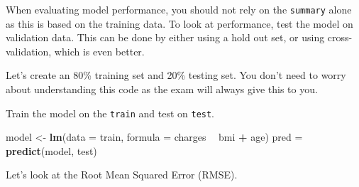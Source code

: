 \documentclass[openany]{book}
\newenvironment{Shaded}{\begin{snugshade}}{\end{snugshade}}
\newcommand{\CommentTok}[1]{\textcolor[rgb]{0.56,0.35,0.01}{\textit{#1}}}
\newcommand{\ControlFlowTok}[1]{\textcolor[rgb]{0.13,0.29,0.53}{\textbf{#1}}}
\newcommand{\DataTypeTok}[1]{\textcolor[rgb]{0.13,0.29,0.53}{#1}}
\newcommand{\DecValTok}[1]{\textcolor[rgb]{0.00,0.00,0.81}{#1}}
\newcommand{\FloatTok}[1]{\textcolor[rgb]{0.00,0.00,0.81}{#1}}
\newcommand{\KeywordTok}[1]{\textcolor[rgb]{0.13,0.29,0.53}{\textbf{#1}}}
\newcommand{\NormalTok}[1]{#1}
\newcommand{\OperatorTok}[1]{\textcolor[rgb]{0.81,0.36,0.00}{\textbf{#1}}}
\newcommand{\StringTok}[1]{\textcolor[rgb]{0.31,0.60,0.02}{#1}}
\begin{document}
When evaluating model performance, you should not rely on the \texttt{summary} alone as this is based on the training data. To look at performance, test the model on validation data. This can be done by either using a hold out set, or using cross-validation, which is even better.

Let's create an 80\% training set and 20\% testing set. You don't need to worry about understanding this code as the exam will always give this to you.

\begin{Shaded}
\end{Shaded}

Train the model on the \texttt{train} and test on \texttt{test}.

\begin{Shaded}
\begin{Highlighting}[]
\NormalTok{model <-}\StringTok{ }\KeywordTok{lm}\NormalTok{(}\DataTypeTok{data =}\NormalTok{ train, }\DataTypeTok{formula =}\NormalTok{ charges }\OperatorTok{~}\StringTok{ }\NormalTok{bmi }\OperatorTok{+}\StringTok{ }\NormalTok{age)}
\NormalTok{pred =}\StringTok{ }\KeywordTok{predict}\NormalTok{(model, test)}
\end{Highlighting}
\end{Shaded}

Let's look at the Root Mean Squared Error (RMSE).

\begin{Shaded}
\end{Shaded}
\end{document}
